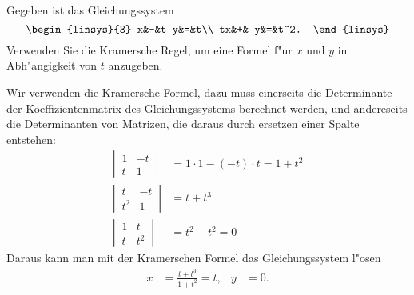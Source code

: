 Gegeben ist das Gleichungssystem
\[
\begin{linsys}{3}
 x&-&t y&=&t\\
tx&+&  y&=&t^2.
\end{linsys}
\]
Verwenden Sie die Kramersche Regel, um 
eine Formel f"ur $x$ und $y$ in Abh"angigkeit von $t$ anzugeben.

\begin{loesung}
Wir verwenden die Kramersche Formel, dazu muss einerseits die Determinante
der Koeffizientenmatrix des Gleichungssystems berechnet werden,
und andereseits die Determinanten von Matrizen, die daraus durch ersetzen
einer Spalte entstehen:
\begin{align*}
\left|\,\begin{matrix}1&-t\\t&1\end{matrix}\,\right|
&=1\cdot 1-(-t)\cdot t=1+t^2
\\
\left|\,\begin{matrix}t&-t\\t^2&1\end{matrix}\,\right|
&=t+t^3
\\
\left|\,\begin{matrix}1&t\\t&t^2\end{matrix}\,\right|
&=t^2-t^2=0
\end{align*}
Daraus kann man mit der Kramerschen Formel das Gleichungssystem l"osen
\begin{align*}
x&=\frac{t+t^3}{1+t^2}=t,&
y&=0.
\end{align*}
\end{loesung}
